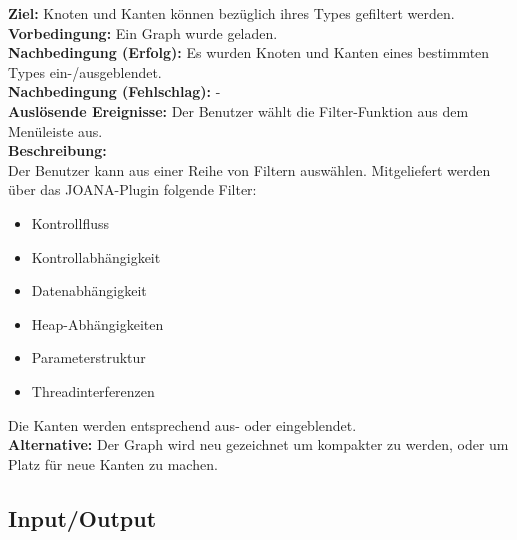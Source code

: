 \label{fa:filter}
\textbf{Ziel:} Knoten und Kanten können bezüglich ihres Types gefiltert werden.\\
\textbf{Vorbedingung:} Ein Graph wurde geladen.\\
\textbf{Nachbedingung (Erfolg):} Es wurden Knoten und Kanten eines bestimmten Types ein-/ausgeblendet.\\
\textbf{Nachbedingung (Fehlschlag):} -\\
\textbf{Auslösende Ereignisse:}
Der Benutzer wählt die Filter-Funktion aus dem Menüleiste aus.\\
\textbf{Beschreibung:}\\
Der Benutzer kann aus einer Reihe von Filtern auswählen.
Mitgeliefert werden über das JOANA-Plugin folgende Filter: %
\begin{itemize}[nolistsep]
  \item Kontrollfluss
  \item Kontrollabhängigkeit
  \item Datenabhängigkeit
  \item Heap-Abhängigkeiten
  \item Parameterstruktur
  \item Threadinterferenzen
\end{itemize}
Die Kanten werden entsprechend aus- oder eingeblendet.\\
\textbf{Alternative:}
Der Graph wird neu gezeichnet um kompakter zu werden, oder um Platz für neue Kanten zu machen.

\subsection{Input/Output}
\setcounter{fanr}{100}

